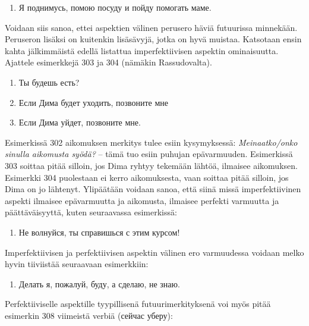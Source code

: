 \documentclass[]{scrreprt}
\providecommand{\tightlist}{%
  \setlength{\itemsep}{0pt}\setlength{\parskip}{0pt}}
\begin{document}
\begin{enumerate}
\def\labelenumi{(\arabic{enumi})}
\setcounter{enumi}{300}
\tightlist
\item
  Я поднимусь, помою посуду и пойду помогать маме.
\end{enumerate}

Voidaan siis sanoa, ettei aspektien välinen perusero häviä futuurissa
minnekään. Peruseron lisäksi on kuitenkin lisäsävyjä, jotka on hyvä
muistaa. Katsotaan ensin kahta jälkimmäistä edellä listattua
imperfektiivisen aspektin ominaisuutta. Ajattele esimerkkejä 303 ja 304
(nämäkin Rassudovalta).

\begin{enumerate}
\def\labelenumi{(\arabic{enumi})}
\setcounter{enumi}{301}
\tightlist
\item
  Ты будешь есть?
\item
  Если Дима будет уходить, позвоните мне
\item
  Если Дима уйдет, позвоните мне.
\end{enumerate}

Esimerkissä 302 aikomuksen merkitys tulee esiin kysymyksessä:
\emph{Meinaatko/onko sinulla aikomusta syödä?} -- tämä tuo esiin puhujan
epävarmuuden. Esimerkissä 303 soittaa pitää silloin, jos Dima ryhtyy
tekemään lähtöä, ilmaisee aikomuksen. Esimerkki 304 puolestaan ei kerro
aikomuksesta, vaan soittaa pitää silloin, jos Dima on jo lähtenyt.
Ylipäätään voidaan sanoa, että siinä missä imperfektiivinen aspekti
ilmaisee epävarmuutta ja aikomusta, ilmaisee perfekti varmuutta ja
päättäväisyyttä, kuten seuraavassa esimerkissä:

\begin{enumerate}
\def\labelenumi{(\arabic{enumi})}
\setcounter{enumi}{304}
\tightlist
\item
  Не волнуйся, ты справишься с этим курсом!
\end{enumerate}

Imperfektiivisen ja perfektiivisen aspektin välinen ero varmuudessa
voidaan melko hyvin tiiviistää seuraavaan esimerkkiin:

\begin{enumerate}
\def\labelenumi{(\arabic{enumi})}
\setcounter{enumi}{305}
\tightlist
\item
  Делать я, пожалуй, буду, а сделаю, не знаю.
\end{enumerate}

Perfektiiviselle aspektille tyypillisenä futuurimerkityksenä voi myös
pitää esimerkin 308 viimeistä verbiä (сейчас уберу):
\end{document}
